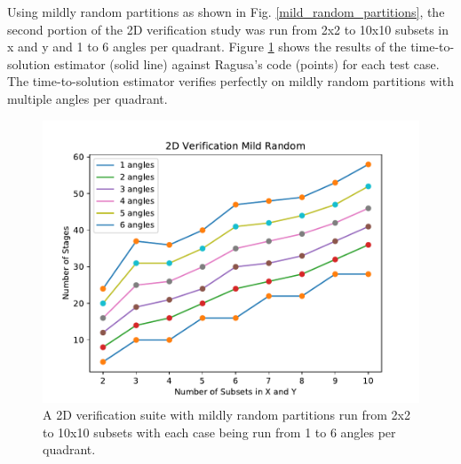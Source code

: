 Using mildly random partitions as shown in Fig. \ref{mild_random_partitions}, the second portion of the 2D verification study was run from 2x2 to 10x10 subsets in x and y and 1 to 6 angles per quadrant.  Figure \ref{mild_random_verification} shows the results of the time-to-solution estimator (solid line) against Ragusa's code (points) for each test case. The time-to-solution estimator verifies perfectly on mildly random partitions with multiple angles per quadrant. 

\begin{figure}[H]
\centering
\includegraphics[scale=0.8]{../figures/mild_random_verification.pdf}
\caption{A 2D verification suite with mildly random partitions run from 2x2 to 10x10 subsets with each case being run from 1 to 6 angles per quadrant.}
\label{mild_random_verification}
\end{figure}

